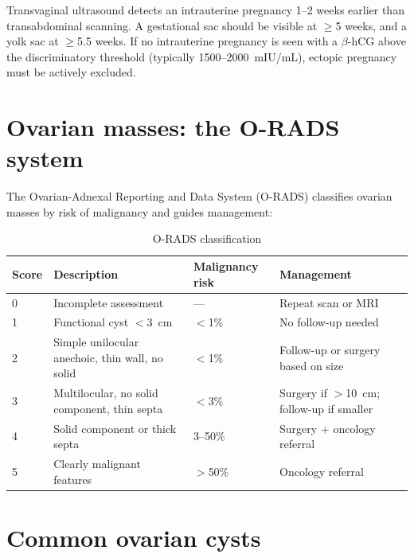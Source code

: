 \begin{pearlbox}
Transvaginal ultrasound detects an intrauterine pregnancy 1--2 weeks earlier than transabdominal scanning. A gestational sac should be visible at $\geq$5 weeks, and a yolk sac at $\geq$5.5 weeks. If no intrauterine pregnancy is seen with a $\beta$-hCG above the discriminatory threshold (typically 1500--2000~mIU/mL), ectopic pregnancy must be actively excluded.
\end{pearlbox}

\section{Ovarian masses: the O-RADS system}
The Ovarian-Adnexal Reporting and Data System (O-RADS) classifies ovarian masses by risk of malignancy and guides management:

\begin{table}[h]
\centering
\caption{O-RADS classification}
\label{tab:orads}
\begin{tabular}{@{}p{}p{}p{}p{}@{}}
\hline
\textbf{Score} & \textbf{Description} & \textbf{Malignancy risk} & \textbf{Management} \\
\hline
0 & Incomplete assessment & --- & Repeat scan or MRI \\
1 & Functional cyst $<$3~cm & $<$1\% & No follow-up needed \\
2 & Simple unilocular anechoic, thin wall, no solid & $<$1\% & Follow-up or surgery based on size \\
3 & Multilocular, no solid component, thin septa & $<$3\% & Surgery if $>$10~cm; follow-up if smaller \\
4 & Solid component or thick septa & 3--50\% & Surgery + oncology referral \\
5 & Clearly malignant features & $>$50\% & Oncology referral \\
\hline
\end{tabular}
\end{table}

\section{Common ovarian cysts}

